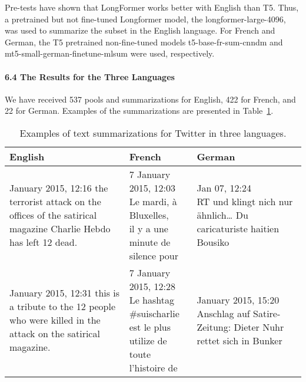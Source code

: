 Pre-tests have shown that LongFormer works better with English than T5. Thus, a pretrained but not fine-tuned Longformer model, the longformer-large-4096, was used to summarize the subset in the English language. For French and German, the T5 pretrained non-fine-tuned models t5-base-fr-sum-cnndm and mt5-small-german-finetune-mlsum were used, respectively.

\paragraph{6.4 The Results for the Three Languages}
We have received 537 pools and summarizations for English, 422 for French, and 22 for German. Examples of the summarizations are presented in Table~\cref{tab:twitterThreeLanguagesSummarizations}.

\begin{table}[ht]%
	\caption{Examples of text summarizations for Twitter in three languages.}%
	\label{tab:twitterThreeLanguagesSummarizations}%
	\renewcommand{\arraystretch}{1.6}%
	\def\tabularxcolumn#1{m{#1}}
	\begin{tabularx}{\textwidth}{@{}>{\centering}m{5cm} >{\centering}m{6cm} >{\centering\arraybackslash}m{5cm}@{}}%
		\toprule     %
		English & French & German\\
		\midrule %
		7 January 2015, 12:16 the terrorist attack on the offices of the satirical magazine Charlie Hebdo has left 12 dead. & \makecell{\colorbox{yellow!25}{7 January 2015, 12:03}\\\colorbox{yellow!25}{Le mardi, à Bluxelles,}\\\colorbox{yellow!25}{il y a une minute de}\\\colorbox{yellow!25}{silence pour}} & \makecell{\colorbox{yellow!25}{Jan 07, 12:24}\\\colorbox{yellow!25}{RT und klingt nich nur}\\\colorbox{yellow!25}{ähnlich… Du}\\\colorbox{yellow!25}{caricaturiste haitien}\\\colorbox{yellow!25}{Bousiko}}\\
		7 January 2015, 12:31 this is a tribute to the 12 people who were killed in the attack on the satirical magazine. & \makecell{\colorbox{yellow!25}{7 January 2015, 12:28}\\\colorbox{yellow!25}{Le hashtag \#suischarlie}\\\colorbox{yellow!25}{est le plus utilize de}\\\colorbox{yellow!25}{toute l’histoire de}} & 7 January 2015, 15:20 Anschlag auf Satire-Zeitung: Dieter Nuhr rettet sich in Bunker\\

\end{tabularx}
\end{table}

